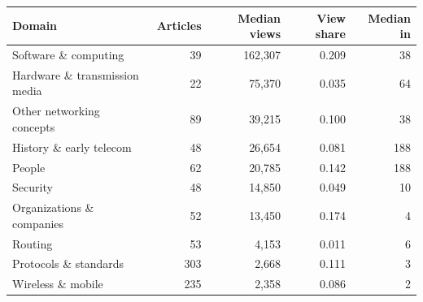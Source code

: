 
\begin{tabular}{lrrrr}
\toprule
Domain & Articles & Median views & View share & Median in\\
\midrule
Software \& computing & 39 & 162,307 & 0.209 & 38\\
Hardware \& transmission media & 22 & 75,370 & 0.035 & 64\\
Other networking concepts & 89 & 39,215 & 0.100 & 38\\
History \& early telecom & 48 & 26,654 & 0.081 & 188\\
People & 62 & 20,785 & 0.142 & 188\\
Security & 48 & 14,850 & 0.049 & 10\\
Organizations \& companies & 52 & 13,450 & 0.174 & 4\\
Routing & 53 & 4,153 & 0.011 & 6\\
Protocols \& standards & 303 & 2,668 & 0.111 & 3\\
Wireless \& mobile & 235 & 2,358 & 0.086 & 2\\
\bottomrule
\end{tabular}

